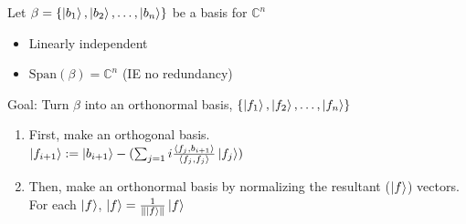 \documentclass[12pt]{article}
\theoremstyle{plain}
\theoremstyle{nonumberplain}
\theoremstyle{plain}
\theoremstyle{nonumberplain}
\newcommand\1{{\bf 1}}
\newcommand{\C}{\mathbb{C}} %
\newcommand{\<}{\left\langle}
\renewcommand{\>}{\right\rangle}
\newcommand{\lp}{\left(}
\newcommand{\rp}{\right)}
\newcommand{\lb}{\left\{}
\newcommand{\rb}{\right\}}
\newcommand{\norm}[1]{\left\lVert#1\right\rVert} %
\newcommand{\inp}[2]{\left\langle#1, #2\right\rangle} %
\newcommand{\spn}[1]{\text{Span}\lp #1\rp} %
\newcommand{\setofkets}[1]{\lb \ket{#1_1}, \ket{#1_2}, \ldots, \ket{#1_n}\rb} %
\begin{document}
Let $\beta=\setofkets{b}$ be a basis for $\C^n$
\begin{itemize}
\item Linearly independent
\item $\spn{\beta}=\C^n$ (IE no redundancy)
\end{itemize}
Goal: Turn $\beta$ into an orthonormal basis, $\setofkets{f}$
\begin{enumerate}
\item First, make an orthogonal basis. \\
$\ket{f_{i+1}}:=\ket{b_{i+1}}-(\sum_{j=1}{i} \frac{\inp{f_j}{b_{i+1}}}{\inp{f_j}{f_j}}\ket{f_j})$
\item Then, make an orthonormal basis by normalizing the resultant ($\ket{f}$) vectors. \\
For each $\ket{f}$, $\ket{f}=\frac{1}{\norm{\ket{f}}}\ket{f}$
\end{enumerate}

\end{document}
